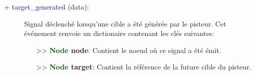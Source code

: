 \documentclass[a4paper, 11pt]{article}
\begin{document}
	\newpage \begin{description}
		\item [+ \textcolor{blue}{target\_generated} (data):] Signal déclenché lorsqu'une cible a été 
		générée par le pisteur. Cet \\événement renvoie un dictionaire contenant les clés suivantes:
		\begin{itemize}
			\item [>> \textbf{\textcolor{darkgreen}{Node} node}:] Contient le noeud où ce signal a été émit.
			\item [>> \textbf{\textcolor{darkgreen}{Node} target}:] Contient la référence de la future cible
			du pisteur.\\
		\end{itemize}
	\end{description}
\end{document}
